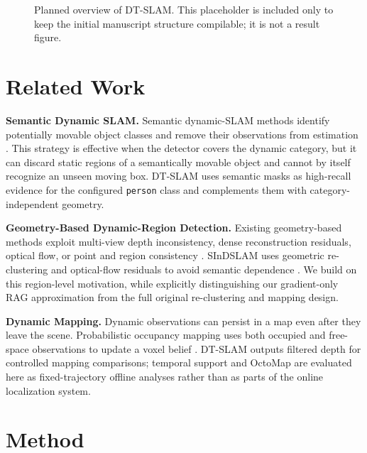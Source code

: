 \documentclass[10pt]{article}
\begin{document}
\begin{figure}[t]
\centering
{}
\caption{Planned overview of DT-SLAM. This placeholder is included only to
keep the initial manuscript structure compilable; it is not a result figure.}
\label{fig:pipeline}
\end{figure}

\section{Related Work}

\textbf{Semantic Dynamic SLAM.} Semantic dynamic-SLAM methods identify potentially movable object classes and remove their observations from estimation \citep{dynaslam,dgs,ji2021}. This strategy is effective when the detector covers the dynamic category, but it can discard static regions of a semantically movable object and cannot by itself recognize an unseen moving box. DT-SLAM uses semantic masks as high-recall evidence for the configured \texttt{person} class and complements them with category-independent geometry.

\textbf{Geometry-Based Dynamic-Region Detection.} Existing geometry-based methods exploit multi-view depth inconsistency, dense reconstruction residuals, optical flow, or point and region consistency \citep{refusion,detectfusion,flowfusion,ji2021}. SInDSLAM uses geometric re-clustering and optical-flow residuals to avoid semantic dependence \citep{sindslam}. We build on this region-level motivation, while explicitly distinguishing our gradient-only RAG approximation from the full original re-clustering and mapping design.

\textbf{Dynamic Mapping.} Dynamic observations can persist in a map even after they leave the scene. Probabilistic occupancy mapping uses both occupied and free-space observations to update a voxel belief \citep{octomap}. DT-SLAM outputs filtered depth for controlled mapping comparisons; temporal support and OctoMap are evaluated here as fixed-trajectory offline analyses rather than as parts of the online localization system.

\section{Method}
\end{document}
